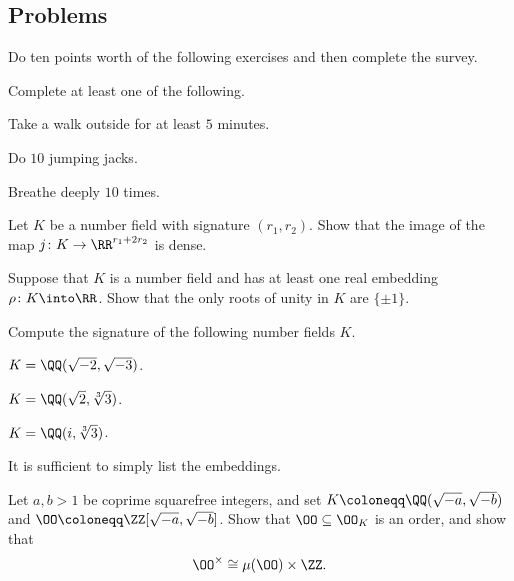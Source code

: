 \documentclass[../notes.tex]{subfiles}
\begin{document}
\subsection{Problems}
Do ten points worth of the following exercises and then complete the survey.
\begin{prob}[1 point]
	Complete at least one of the following.
	\begin{listalph}
		\item Take a walk outside for at least $5$ minutes.
		\item Do $10$ jumping jacks.
		\item Breathe deeply $10$ times.
	\end{listalph}
\end{prob}
\begin{prob}[2 points]
	Let $K$ be a number field with signature $(r_1,r_2)$. Show that the image of the map $j\colon K\to\RR^{r_1+2r_2}$ is dense.
\end{prob}
\begin{prob}[2 points]
	Suppose that $K$ is a number field and has at least one real embedding $\rho\colon K\into\RR$. Show that the only roots of unity in $K$ are $\{\pm1\}$.
\end{prob}
\begin{prob}[3 points]
	Compute the signature of the following number fields $K$.
	\begin{listalph}
		\item $K=\QQ(\sqrt{-2},\sqrt{-3})$.
		\item $K=\QQ(\sqrt2,\sqrt[3]3)$.
		\item $K=\QQ(i,\sqrt[3]3)$.
	\end{listalph}
	It is sufficient to simply list the embeddings.
\end{prob}
\begin{prob}[3 points]
	Let $a,b>1$ be coprime squarefree integers, and set $K\coloneqq\QQ(\sqrt{-a},\sqrt{-b})$ and $\OO\coloneqq\ZZ[\sqrt{-a},\sqrt{-b}]$. Show that $\OO\subseteq\OO_K$ is an order, and show that
	\[\OO^\times\cong\mu(\OO)\times\ZZ.\]
\end{prob}
\end{document}
